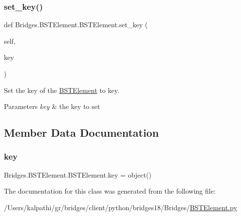 \subsubsection{\texorpdfstring{set\+\_\+key()}{set\_key()}}
{\footnotesize\ttfamily def Bridges.\+B\+S\+T\+Element.\+B\+S\+T\+Element.\+set\+\_\+key (\begin{DoxyParamCaption}\item[{}]{self,  }\item[{}]{key }\end{DoxyParamCaption})}



Set the key of the \mbox{\hyperlink{class_bridges_1_1_b_s_t_element_1_1_b_s_t_element}{B\+S\+T\+Element}} to key. 


\begin{DoxyParams}{Parameters}
{\em key} & the key to set \\
\hline
\end{DoxyParams}


\subsection{Member Data Documentation}
\mbox{\label{class_bridges_1_1_b_s_t_element_1_1_b_s_t_element_a2361f6985c8e968645c57ecdb837d000}} 
\subsubsection{\texorpdfstring{key}{key}}
{\footnotesize\ttfamily Bridges.\+B\+S\+T\+Element.\+B\+S\+T\+Element.\+key = object()\hspace{0.3cm}{\ttfamily [static]}}



The documentation for this class was generated from the following file\+:\begin{DoxyCompactItemize}
\item 
/\+Users/kalpathi/gr/bridges/client/python/bridges18/\+Bridges/\mbox{\hyperlink{_b_s_t_element_8py}{B\+S\+T\+Element.\+py}}\end{DoxyCompactItemize}

